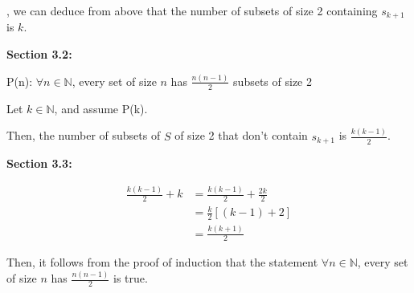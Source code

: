\documentclass[12pt]{article}
\begin{document}
\begin{enumerate}[a.]
    \bigskip

    , we can deduce from above that the number of subsets of size 2 containing
    $s_{k+1}$ is $k$.

    \bigskip

    \textbf{Section 3.2:}

    \bigskip

    P(n): $\forall n \in \mathbb{N}$, every set of size $n$ has $\frac{n(n-1)}{2}$
    subsets of size 2

    \bigskip

    Let $k \in \mathbb{N}$, and assume P(k).

    \bigskip

    Then, the number of subsets of $S$ of size 2 that don't contain $s_{k+1}$ is
    $\frac{k(k-1)}{2}$.

    \bigskip

    \textbf{Section 3.3:}

    \begin{align}
        \frac{k(k-1)}{2} + k &= \frac{k(k-1)}{2} + \frac{2k}{2}\\
        &= \frac{k}{2}\left[(k-1) + 2\right]\\
        &= \frac{k(k+1)}{2}
    \end{align}

    \bigskip

    Then, it follows from the proof of induction that the statement $\forall n
    \in \mathbb{N}$, every set of size $n$ has $\frac{n(n-1)}{2}$ is true.

\end{enumerate}
\end{document}
